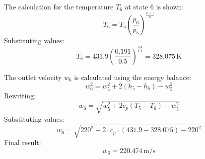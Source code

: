 The calculation for the temperature \( T_6 \) at state 6 is shown:  
\[
T_6 = T_5 \left( \frac{p_6}{p_5} \right)^{\frac{\kappa - 1}{\kappa}}
\]
Substituting values:  
\[
T_6 = 431.9 \left( \frac{0.191}{0.5} \right)^{\frac{0.4}{1.4}} = 328.075 \, \text{K}
\]

The outlet velocity \( w_6 \) is calculated using the energy balance:  
\[
w_6^2 = w_5^2 + 2 \left( h_5 - h_6 \right) - w_5^2
\]
Rewriting:  
\[
w_6 = \sqrt{w_5^2 + 2 c_p \left( T_5 - T_6 \right) - w_5^2}
\]
Substituting values:  
\[
w_6 = \sqrt{220^2 + 2 \cdot c_p \cdot (431.9 - 328.075) - 220^2}
\]
Final result:  
\[
w_6 = 220.474 \, \text{m/s}
\]